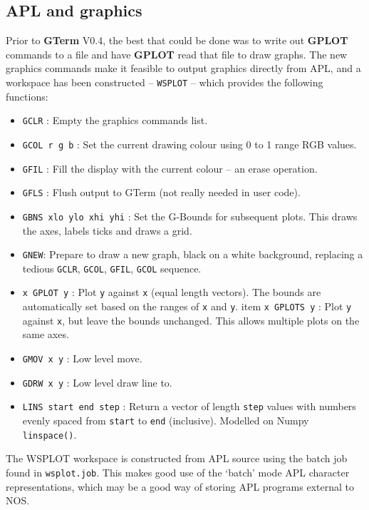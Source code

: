 \documentclass[a4paper,twoside,11pt]{article}
\newcommand{\newpara}{\par\vspace{4mm}\noindent}
\begin{document}
\subsection{APL and graphics}
Prior to \textbf{GTerm} V0.4, the best that could 
be done was to write out \textbf{GPLOT} commands to a file and have \textbf{GPLOT} read that
file to draw graphs. The new graphics commands make it feasible to output graphics directly from APL,
and a workspace has been constructed -- \texttt{WSPLOT} -- which provides
the following functions:

\begin{itemize}
\item \texttt{GCLR} : Empty the graphics commands list.
\item \texttt{GCOL r g b} : Set the current drawing colour using 0 to 1 range RGB values.
\item \texttt{GFIL} : Fill the display with the current colour -- an erase operation.
\item \texttt{GFLS} : Flush output to GTerm (not really needed in user code).
\item \texttt{GBNS xlo ylo xhi yhi} : Set the G-Bounds for subsequent plots. This draws the axes, labels ticks and draws a grid.
\item \texttt{GNEW}: Prepare to draw a new graph, black on a white background, replacing a tedious \texttt{GCLR}, \texttt{GCOL}, \texttt{GFIL}, \texttt{GCOL} sequence.
\item \texttt{x GPLOT y} : Plot \texttt{y} against \texttt{x} (equal length vectors). The bounds are automatically set based on the ranges of \texttt{x} and \texttt{y}.
item \texttt{x GPLOTS y} : Plot \texttt{y} against \texttt{x}, but leave the bounds unchanged. This allows multiple plots on the same axes.
\item \texttt{GMOV x y} : Low level move.
\item \texttt{GDRW x y} : Low level draw line to.
\item \texttt{LINS start end step} : Return a vector of  length \texttt{step} values with numbers evenly spaced from \texttt{start} to \texttt{end} (inclusive). Modelled on Numpy \texttt{linspace()}.
\end{itemize}

\newpara
The WSPLOT workspace is constructed from APL source using the batch job found in \texttt{wsplot.job}. 
This makes good use of the `batch' mode APL character representations, which may be a good way of storing 
APL programs external to NOS.
\end{document}
